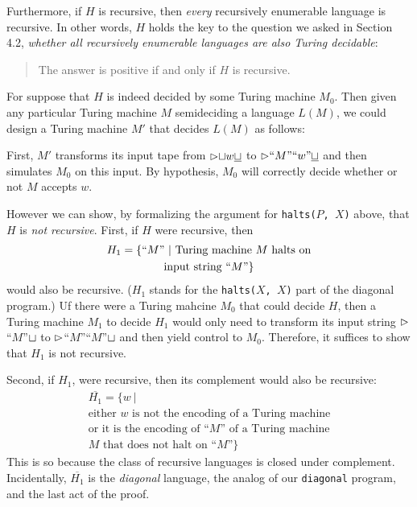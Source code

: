 Furthermore, if $H$ is recursive, then \textit{every} recursively enumerable language is recursive. In other words, $H$ holds the key to the question we asked in Section 4.2, \textit{whether all recursively enumerable languages are also Turing decidable}:
\begin{quote}
  The answer is positive if and only if $H$ is recursive.
\end{quote}
For suppose that $H$ is indeed decided by some Turing machine $M_0$. Then given any particular Turing machine $M$ semideciding a language $L(M)$, we could design a Turing machine $M'$ that decides $L(M)$ as follows:

First, $M'$ transforms its input tape from ${\vartriangleright}{\sqcup}w{\underline{\sqcup}}$ to ${\vartriangleright}{\textnormal{``}M\textnormal{''``}w\textnormal{''}}{\underline{\sqcup}}$ and then simulates $M_0$ on this input. By hypothesis, $M_0$ will correctly decide whether or not $M$ accepts $w$. 

However we can show, by formalizing the argument for \texttt{halts($P$, $X$)} above, that $H$ is \textit{not recursive}. First, if $H$ were recursive, then
\begin{multline*}
  H_1 = \{ \textnormal{``$M$''}\ |\ \textnormal{Turing machine $M$ halts on} \\ \textnormal{input string ``$M$''} \}
\end{multline*}
would also be recursive. ($H_1$ stands for the \texttt{halts($X$, $X$)} part of the diagonal program.) Uf there were a Turing mahcine $M_0$ that could decide $H$, then a Turing machine $M_1$ to decide $H_1$ would only need to transform its input string {$\vartriangleright$}{``$M$''}{\underline{$\sqcup$}} to {$\vartriangleright$}{``$M$''}{``$M$''}{\underline{$\sqcup$}} and then yield control to $M_0$. Therefore, it suffices to show that $H_1$ is not recursive.

Second, if $H_1$, were recursive, then its complement would also be recursive:
\begin{multline*}
  \overline{H_1} = 
  \{
    w\ |\ \\
    \text{either $w$ is not the encoding of a Turing machine} \\
    \text{or it is the encoding of ``$M$'' of a Turing machine} \\
    \text{$M$ that does not halt on ``$M$''}
  \}
\end{multline*}
This is so because the class of recursive languages is closed under complement. Incidentally, $\overline{H_1}$ is the \textit{diagonal} language, the analog of our \texttt{diagonal} program, and the last act of the proof.

